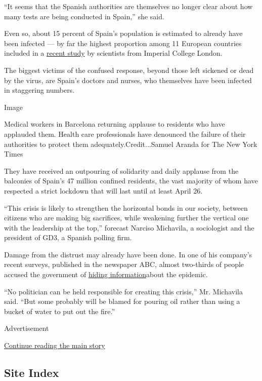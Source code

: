 ``It seems that the Spanish authorities are themselves no longer clear
about how many tests are being conducted in Spain,'' she said.

Even so, about 15 percent of Spain's population is estimated to already
have been infected --- by far the highest proportion among 11 European
countries included in a
\href{https://www.imperial.ac.uk/media/imperial-college/medicine/sph/ide/gida-fellowships/Imperial-College-COVID19-Europe-estimates-and-NPI-impact-30-03-2020.pdf}{recent
study} by scientists from Imperial College London.

The biggest victims of the confused response, beyond those left sickened
or dead by the virus, are Spain's doctors and nurses, who themselves
have been infected in staggering numbers.

Image

Medical workers in Barcelona returning applause to residents who have
applauded them. Health care professionals have denounced the failure of
their authorities to protect them adequately.Credit...Samuel Aranda for
The New York Times

They have received an outpouring of solidarity and daily applause from
the balconies of Spain's 47 million confined residents, the vast
majority of whom have respected a strict lockdown that will last until
at least April 26.

``This crisis is likely to strengthen the horizontal bonds in our
society, between citizens who are making big sacrifices, while weakening
further the vertical one with the leadership at the top,'' forecast
Narciso Michavila, a sociologist and the president of GD3, a Spanish
polling firm.

Damage from the distrust may already have been done. In one of his
company's recent surveys, published in the newspaper ABC, almost
two-thirds of people accused the government of
\href{https://www.abc.es/espana/abci-cada-tres-espanoles-creen-gobierno-esta-ocultando-informacion-202003300248_noticia.html}{hiding
information}about the epidemic.

``No politician can be held responsible for creating this crisis,'' Mr.
Michavila said. ``But some probably will be blamed for pouring oil
rather than using a bucket of water to put out the fire.''

Advertisement

\protect\hyperlink{after-bottom}{Continue reading the main story}

\hypertarget{site-index}{%
\subsection{Site Index}\label{site-index}}

